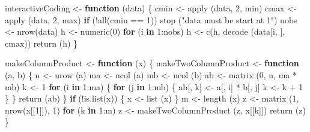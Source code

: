 \documentclass[
  12pt,
]{book}
\newenvironment{Shaded}{\begin{snugshade}}{\end{snugshade}}
\newcommand{\ControlFlowTok}[1]{\textcolor[rgb]{0.13,0.29,0.53}{\textbf{#1}}}
\newcommand{\DecValTok}[1]{\textcolor[rgb]{0.00,0.00,0.81}{#1}}
\newcommand{\FunctionTok}[1]{\textcolor[rgb]{0.00,0.00,0.00}{#1}}
\newcommand{\NormalTok}[1]{#1}
\newcommand{\OtherTok}[1]{\textcolor[rgb]{0.56,0.35,0.01}{#1}}
\newcommand{\SpecialCharTok}[1]{\textcolor[rgb]{0.00,0.00,0.00}{#1}}
\newcommand{\StringTok}[1]{\textcolor[rgb]{0.31,0.60,0.02}{#1}}
\begin{document}
\begin{Shaded}
\begin{Highlighting}[]
\NormalTok{interactiveCoding }\OtherTok{\textless{}{-}} \ControlFlowTok{function}\NormalTok{ (data) \{}
\NormalTok{  cmin }\OtherTok{\textless{}{-}} \FunctionTok{apply}\NormalTok{ (data, }\DecValTok{2}\NormalTok{, min)}
\NormalTok{  cmax }\OtherTok{\textless{}{-}} \FunctionTok{apply}\NormalTok{ (data, }\DecValTok{2}\NormalTok{, max)}
  \ControlFlowTok{if}\NormalTok{ (}\SpecialCharTok{!}\FunctionTok{all}\NormalTok{(cmin }\SpecialCharTok{==} \DecValTok{1}\NormalTok{))}
    \FunctionTok{stop}\NormalTok{ (}\StringTok{"data must be start at 1"}\NormalTok{)}
\NormalTok{  nobs }\OtherTok{\textless{}{-}} \FunctionTok{nrow}\NormalTok{(data)}
\NormalTok{  h }\OtherTok{\textless{}{-}} \FunctionTok{numeric}\NormalTok{(}\DecValTok{0}\NormalTok{)}
  \ControlFlowTok{for}\NormalTok{ (i }\ControlFlowTok{in} \DecValTok{1}\SpecialCharTok{:}\NormalTok{nobs)}
\NormalTok{    h }\OtherTok{\textless{}{-}} \FunctionTok{c}\NormalTok{(h, }\FunctionTok{decode}\NormalTok{ (data[i, ], cmax))}
  \FunctionTok{return}\NormalTok{ (h)}
\NormalTok{\}}

\NormalTok{makeColumnProduct }\OtherTok{\textless{}{-}} \ControlFlowTok{function}\NormalTok{ (x) \{}
\NormalTok{  makeTwoColumnProduct }\OtherTok{\textless{}{-}} \ControlFlowTok{function}\NormalTok{ (a, b) \{}
\NormalTok{    n }\OtherTok{\textless{}{-}} \FunctionTok{nrow}\NormalTok{ (a)}
\NormalTok{    ma }\OtherTok{\textless{}{-}} \FunctionTok{ncol}\NormalTok{ (a)}
\NormalTok{    mb }\OtherTok{\textless{}{-}} \FunctionTok{ncol}\NormalTok{ (b)}
\NormalTok{    ab }\OtherTok{\textless{}{-}} \FunctionTok{matrix}\NormalTok{ (}\DecValTok{0}\NormalTok{, n, ma }\SpecialCharTok{*}\NormalTok{ mb)}
\NormalTok{    k }\OtherTok{\textless{}{-}} \DecValTok{1}
    \ControlFlowTok{for}\NormalTok{ (i }\ControlFlowTok{in} \DecValTok{1}\SpecialCharTok{:}\NormalTok{ma) \{}
      \ControlFlowTok{for}\NormalTok{ (j }\ControlFlowTok{in} \DecValTok{1}\SpecialCharTok{:}\NormalTok{mb) \{}
\NormalTok{        ab[, k] }\OtherTok{\textless{}{-}}\NormalTok{ a[, i] }\SpecialCharTok{*}\NormalTok{ b[, j]}
\NormalTok{        k }\OtherTok{\textless{}{-}}\NormalTok{ k }\SpecialCharTok{+} \DecValTok{1}
\NormalTok{      \}}
\NormalTok{    \}}
    \FunctionTok{return}\NormalTok{ (ab)}
\NormalTok{  \}}
  \ControlFlowTok{if}\NormalTok{ (}\SpecialCharTok{!}\FunctionTok{is.list}\NormalTok{(x)) \{}
\NormalTok{    x }\OtherTok{\textless{}{-}} \FunctionTok{list}\NormalTok{ (x)}
\NormalTok{  \}}
\NormalTok{  m }\OtherTok{\textless{}{-}} \FunctionTok{length}\NormalTok{ (x)}
\NormalTok{  z }\OtherTok{\textless{}{-}} \FunctionTok{matrix}\NormalTok{ (}\DecValTok{1}\NormalTok{, }\FunctionTok{nrow}\NormalTok{(x[[}\DecValTok{1}\NormalTok{]]), }\DecValTok{1}\NormalTok{)}
  \ControlFlowTok{for}\NormalTok{ (k }\ControlFlowTok{in} \DecValTok{1}\SpecialCharTok{:}\NormalTok{m)}
\NormalTok{    z }\OtherTok{\textless{}{-}} \FunctionTok{makeTwoColumnProduct}\NormalTok{ (z, x[[k]])}
  \FunctionTok{return}\NormalTok{ (z)}
\NormalTok{\}}



\end{Highlighting}
\end{Shaded}
\end{document}
